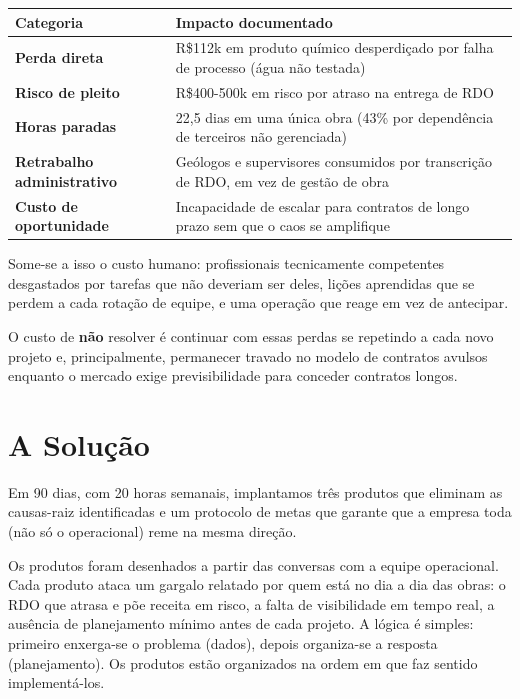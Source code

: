 \documentclass[12pt,a4paper]{scrartcl}
\begin{document}
\vspace{0.3cm}
\begin{tabular}{p{5cm} p{9cm}}
\textbf{Categoria} & \textbf{Impacto documentado} \\
\hline
\textbf{Perda direta} & R\$112k em produto químico desperdiçado por falha de processo (água não testada) \\
\textbf{Risco de pleito} & R\$400-500k em risco por atraso na entrega de RDO \\
\textbf{Horas paradas} & 22,5 dias em uma única obra (43\% por dependência de terceiros não gerenciada) \\
\textbf{Retrabalho administrativo} & Geólogos e supervisores consumidos por transcrição de RDO, em vez de gestão de obra \\
\textbf{Custo de oportunidade} & Incapacidade de escalar para contratos de longo prazo sem que o caos se amplifique \\
\end{tabular}
\vspace{0.3cm}

Some-se a isso o custo humano: profissionais tecnicamente competentes desgastados por tarefas que não deveriam ser deles, lições aprendidas que se perdem a cada rotação de equipe, e uma operação que reage em vez de antecipar.

O custo de \textbf{não} resolver é continuar com essas perdas se repetindo a cada novo projeto e, principalmente, permanecer travado no modelo de contratos avulsos enquanto o mercado exige previsibilidade para conceder contratos longos.

\section{A Solução}

Em 90 dias, com 20 horas semanais, implantamos três produtos que eliminam as causas-raiz identificadas e um protocolo de metas que garante que a empresa toda (não só o operacional) reme na mesma direção.

Os produtos foram desenhados a partir das conversas com a equipe operacional. Cada produto ataca um gargalo relatado por quem está no dia a dia das obras: o RDO que atrasa e põe receita em risco, a falta de visibilidade em tempo real, a ausência de planejamento mínimo antes de cada projeto. A lógica é simples: primeiro enxerga-se o problema (dados), depois organiza-se a resposta (planejamento). Os produtos estão organizados na ordem em que faz sentido implementá-los.
\end{document}
